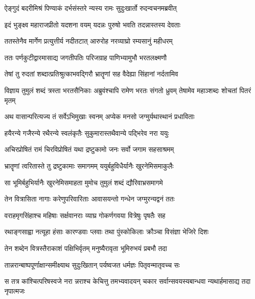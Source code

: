 \twolineshloka
{ऐङ्गुदं बदरीमिश्रं पिण्याकं दर्भसंस्तरे}
{न्यस्य रामः सुदुःखार्तो रुदन्वचनमब्रवीत्} %

\twolineshloka
{इदं भुङ्क्ष्व महाराजप्रीतो यदशना वयम्}
{यदन्नः पुरुषो भवति तदन्नास्तस्य देवताः} %

\twolineshloka
{ततस्तेनैव मार्गेण प्रत्युत्तीर्य नदीतटात्}
{आरुरोह नरव्याघ्रो रम्यसानुं महीधरम्} %

\twolineshloka
{ततः पर्णकुटीद्वारमासाद्य जगतीपतिः}
{परिजग्राह पाणिभ्यामुभौ भरतलक्ष्मणौ} %

\twolineshloka
{तेषां तु रुदतां शब्दात्प्रतिश्रुत्काभवद्गिरौ}
{भ्रातॄणां सह वैदेह्या सिंहानां नर्दतामिव} %

\threelineshloka
{विज्ञाय तुमुलं शब्दं त्रस्ता भरतसैनिकाः}
{अब्रुवंश्चापि रामेण भरतः संगतो ध्रुवम्}
{तेषामेव महाञ्शब्दः शोचतां पितरं मृतम्} %

\twolineshloka
{अथ वासान्परित्यज्य तं सर्वेऽभिमुखाः स्वनम्}
{अप्येक मनसो जग्मुर्यथास्थानं प्रधाविताः} %

\twolineshloka
{हयैरन्ये गजैरन्ये रथैरन्ये स्वलंकृतैः}
{सुकुमारास्तथैवान्ये पद्भिरेव नरा ययुः} %

\twolineshloka
{अचिरप्रोषितं रामं चिरविप्रोषितं यथा}
{द्रष्टुकामो जनः सर्वो जगाम सहसाश्रमम्} %

\twolineshloka
{भ्रातॄणां त्वरितास्ते तु द्रष्टुकामाः समागमम्}
{ययुर्बहुविधैर्यानैः खुरनेमिसमाकुलैः} %

\twolineshloka
{सा भूमिर्बहुभिर्यानैः खुरनेमिसमाहता}
{मुमोच तुमुलं शब्दं द्यौरिवाभ्रसमागमे} %

\twolineshloka
{तेन वित्रासिता नागाः करेणुपरिवारिताः}
{आवासयन्तो गन्धेन जग्मुरन्यद्वनं ततः} %

\twolineshloka
{वराहमृगसिंहाश्च महिषाः सर्क्षवानराः}
{व्याघ्र गोकर्णगवया वित्रेषुः पृषतैः सह} %

\twolineshloka
{रथाङ्गसाह्वा नत्यूहा हंसाः कारण्डवाः प्लवाः}
{तथा पुंस्कोकिलाः क्रौञ्चा विसंज्ञा भेजिरे दिशः} %

\twolineshloka
{तेन शब्देन वित्रस्तैराकाशं पक्षिभिर्वृतम्}
{मनुष्यैरावृता भूमिरुभयं प्रबभौ तदा} %

\twolineshloka
{तान्नरान्बाष्पपूर्णाक्षान्समीक्ष्याथ सुदुःखितान्}
{पर्यष्वजत धर्मज्ञः पितृवन्मातृवच्च सः} %

\fourlineindentedshloka
{स तत्र कांश्चित्परिषस्वजे नरा}
{न्नराश्च केचित्तु तमभ्यवादयन्}
{चकार सर्वान्सवयस्यबान्धवा}
{न्यथार्हमासाद्य तदा नृपात्मजः} %

